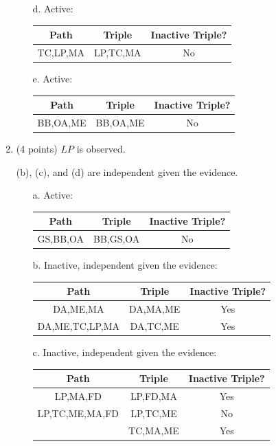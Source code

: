\documentclass[12pt]{article}
\begin{document}
\begin{enumerate}
\begin{enumerate}
		\item[d.]
		Active:
		\begin{center}
			\begin{tabular}{|c|c|c|}
				\hline
				Path & Triple & Inactive Triple? \\
				\hline
				TC,LP,MA & LP,TC,MA & No \\
				\hline
			\end{tabular}
		\end{center}

		\item[e.]
		Active:
		\begin{center}
			\begin{tabular}{|c|c|c|}
				\hline
				Path & Triple & Inactive Triple? \\
				\hline
				BB,OA,ME & BB,OA,ME & No \\
				\hline
			\end{tabular}
		\end{center}

	\end{enumerate}

	\item (4 points) $LP$ is observed.

	(b), (c), and (d) are independent given the evidence.

	\begin{enumerate}
		\item[a.]
		Active:
		\begin{center}
			\begin{tabular}{|c|c|c|}
				\hline
				Path & Triple & Inactive Triple? \\
				\hline
				GS,BB,OA & BB,GS,OA & No \\
				\hline
			\end{tabular}
		\end{center}

		\item[b.]
		Inactive, independent given the evidence:
		\begin{center}
			\begin{tabular}{|c|c|c|}
				\hline
				Path & Triple & Inactive Triple? \\
				\hline
				DA,ME,MA & DA,MA,ME & Yes \\
				\hline
				DA,ME,TC,LP,MA & DA,TC,ME & Yes \\
				\hline
			\end{tabular}
		\end{center}

		\item[c.]
		Inactive, independent given the evidence:
		\begin{center}
			\begin{tabular}{|c|c|c|}
				\hline
				Path & Triple & Inactive Triple? \\
				\hline
				LP,MA,FD & LP,FD,MA & Yes \\
				\hline
				LP,TC,ME,MA,FD & LP,TC,ME & No \\
				& TC,MA,ME & Yes \\
				\hline
			\end{tabular}
		\end{center}


\end{enumerate}
\end{enumerate}
\end{document}

